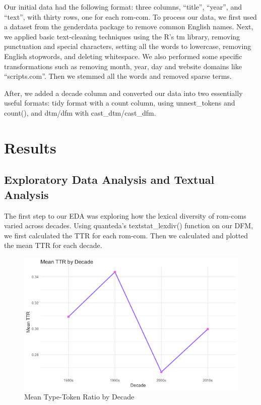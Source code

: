 \documentclass[
  authoryear,
  preprint]{elsarticle}
\begin{document}
Our initial data had the following format: three columns, ``title'',
``year'', and ``text'', with thirty rows, one for each rom-com. To
process our data, we first used a dataset from the genderdata package to
remove common English names. Next, we applied basic text-cleaning
techniques using the R's tm library, removing punctuation and special
characters, setting all the words to lowercase, removing English
stopwords, and deleting whitespace. We also performed some specific
transformations such as removing month, year, day and website domains
like ``scripts.com''. Then we stemmed all the words and removed sparse
terms.~

After, we added a decade column and converted our data into two
essentially useful formats: tidy format with a count column, using
unnest\_tokens and count(), and dtm/dfm with cast\_dtm/cast\_dfm.~

\section{Results}\label{results}

\subsection{Exploratory Data Analysis and Textual
Analysis}\label{exploratory-data-analysis-and-textual-analysis}

The first step to our EDA was exploring how the lexical diversity of
rom-coms varied across decades. Using quanteda's textstat\_lexdiv()
function on our DFM, we first calculated the TTR for each rom-com. Then
we calculated and plotted the mean TTR for each decade.

\begin{figure}[H]

{\centering \includegraphics{images/mean_ttr.png}

}

\caption{Mean Type-Token Ratio by Decade}

\end{figure}%
\end{document}
